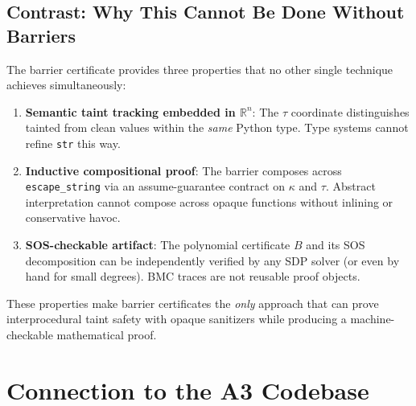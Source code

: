 \documentclass[11pt,a4paper]{article}
\theoremstyle{plain}
\theoremstyle{definition}
\theoremstyle{remark}
\newcommand{\R}{\mathbb{R}}
\begin{document}
\subsection{Contrast: Why This Cannot Be Done Without Barriers}

The barrier certificate provides three properties that no other single
technique achieves simultaneously:

\begin{enumerate}
\item \textbf{Semantic taint tracking embedded in $\R^n$}:
  The $\tau$ coordinate distinguishes tainted from clean values
  within the \emph{same} Python type.  Type systems cannot refine
  \texttt{str} this way.

\item \textbf{Inductive compositional proof}:
  The barrier composes across \texttt{escape\_string} via an
  assume-guarantee contract on $\kappa$ and $\tau$.  Abstract
  interpretation cannot compose across opaque functions without
  inlining or conservative havoc.

\item \textbf{SOS-checkable artifact}:
  The polynomial certificate $B$ and its SOS decomposition can be
  independently verified by any SDP solver (or even by hand for
  small degrees).  BMC traces are not reusable proof objects.
\end{enumerate}

These properties make barrier certificates the \emph{only} approach
that can prove interprocedural taint safety with opaque sanitizers
while producing a machine-checkable mathematical proof.

\section{Connection to the A3 Codebase}
\label{sec:codebase}
\end{document}
